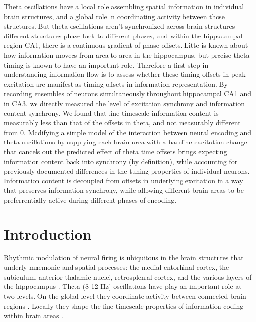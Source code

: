 \documentclass[10pt]{article}
\begin{document}
Theta oscillations have a local role assembling spatial information in individual brain structures, and a global role in coordinating activity between those structures.  But theta oscillations aren't synchronized across brain structures - different structures phase lock to different phases, and within the hippocampal region CA1, there is a continuous gradient of phase offsets.  Litte is known about how information movees from area to area in the hippocampus, but precise theta timing is known to have an important role.  Therefore a first step in understanding information flow is to assess whether these timing offsets in peak excitation are manifest as timing offsets in information representation.  By recording ensembles of neurons simultaneously throughout hippocampal CA1 and in CA3, we directly measured the level of excitation synchrony and information content synchrony.  We found that fine-timescale information content is measurably less than that of the offsets in theta, and not measurably different from 0.  Modifying a simple model of the interaction between neural encoding and theta oscillations by supplying each brain area with a baseline excitation change that cancels out the predicted effect of theta time offsets brings expecting information content back into synchrony (by definition), while accounting for previously documented differences in the tuning properties of individual neurons.  Information content is decoupled from offsets in underlying excitation in a way that preserves information synchrony, while allowing different brain areas to be preferrentially active during different phases of encoding.

\section*{Introduction}
Rhythmic modulation of neural firing is ubiquitous in the brain structures that underly mnemonic and spatial processes: the medial entorhinal cortex, the subiculum, anterior thalamic nuclei, retrosplenial cortex, and the various layers of the hippocampus \cite{vanderwolf1969hippocampal, buzsaki2002theta}.  Theta (8-12 Hz) oscillations have play an important role at two levels. On the global level they coordinate activity between connected brain regions \cite{Siapas2006, Jones2006, Serota2010, Colgin2011}. Locally they shape the fine-timescale properties of information coding within brain areas \cite{Recce1993,Skaggs1996,Mehta2002,Leutgeb2010}.
\end{document}
